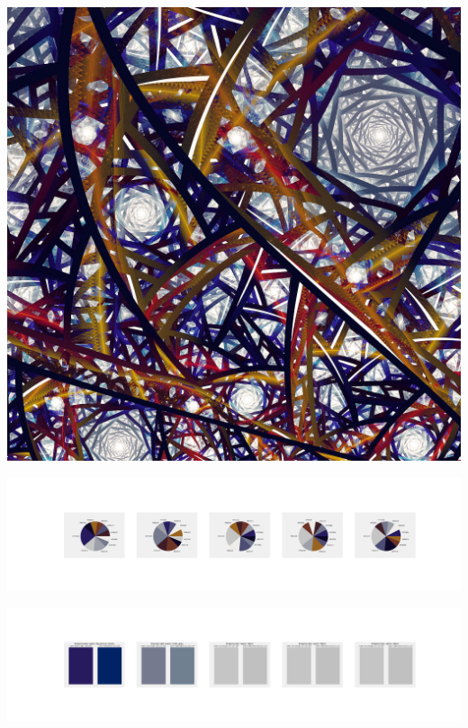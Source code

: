 \documentclass[11pt]{article}
\begin{document}
\begin{landscape}
    \begin{center}
    \includegraphics[width=\textwidth]{./nbimg/file (286).jpg}
    \end{center}

    \begin{center}
    \includegraphics[width=250mm]{./nbimg/pie-207.jpg}
    \end{center}

    \begin{center}
    \includegraphics[width=250mm]{./nbimg/peak-207.jpg}
    \end{center}
    


\end{landscape}
\end{document}
